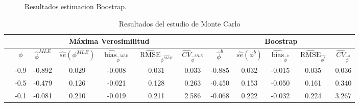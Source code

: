 \begin{figure}[h]
\begin{minipage}{0.45\textwidth}
    \caption{Resultados estimacion Boostrap.}
    \label{fig:monte_carlo_res2}
    \end{minipage}
\end{figure}

\begin{table}[h]
    \centering
    \caption{Resultados del estudio de Monte Carlo}
    \resizebox{18cm}{!} {
    \begin{tabular}{|c|cccccc|ccccc|}
    \hline
    \rowcolor[HTML]{FFFFFF} 
    \multicolumn{1}{|l|}{\cellcolor[HTML]{FFFFFF}} & \multicolumn{6}{c|}{\cellcolor[HTML]{FFFFFF}\textbf{Máxima Verosimilitud}} & \multicolumn{5}{c|}{\cellcolor[HTML]{FFFFFF}\textbf{Boostrap}} \\ \hline
    \rowcolor[HTML]{FFFFFF} 
    \multicolumn{1}{|l|}{\cellcolor[HTML]{FFFFFF}n} & \multicolumn{1}{c|}{\cellcolor[HTML]{FFFFFF}\textbf{$\phi$}} & \multicolumn{1}{c|}{\cellcolor[HTML]{FFFFFF}\textbf{$\hat{\phi}^{MLE}$}} & \multicolumn{1}{c|}{\cellcolor[HTML]{FFFFFF}\textbf{$\hat{se}(\phi^{MLE})$}} & \multicolumn{1}{c|}{\cellcolor[HTML]{FFFFFF}\textbf{$\widehat{\operatorname{bias}}_{\hat{\phi}^{MLE}}$}} & \multicolumn{1}{c|}{\cellcolor[HTML]{FFFFFF}\textbf{$\widehat{\operatorname{RMSE}}_{\hat{\phi^{MLE}}}$}} & \textbf{$\widehat{CV}_{\hat{\phi}^{MLE}}$} & \multicolumn{1}{c|}{\cellcolor[HTML]{FFFFFF}\textbf{$\hat{\phi}^{b}$}} & \multicolumn{1}{c|}{\cellcolor[HTML]{FFFFFF}\textbf{$\hat{se}(\phi^{b})$}} & \multicolumn{1}{c|}{\cellcolor[HTML]{FFFFFF}\textbf{$\widehat{\operatorname{bias}}_{\hat{\phi}^{b}}$}} & \multicolumn{1}{c|}{\cellcolor[HTML]{FFFFFF}\textbf{$\widehat{\operatorname{RMSE}}_{\hat{\phi^{b}}}$}} & \textbf{$\widehat{CV}_{\hat{\phi}^{b}}$} \\ \hline
     & \multicolumn{1}{c|}{-0.9} & \multicolumn{1}{c|}{-0.892} & \multicolumn{1}{c|}{0.029} & \multicolumn{1}{c|}{-0.008} & \multicolumn{1}{c|}{0.031} & 0.033 & \multicolumn{1}{c|}{-0.885} & \multicolumn{1}{c|}{0.032} & \multicolumn{1}{c|}{-0.015} & \multicolumn{1}{c|}{0.035} & 0.036 \\ \cline{2-12} 
     & \multicolumn{1}{c|}{-0.5} & \multicolumn{1}{c|}{-0.479} & \multicolumn{1}{c|}{0.126} & \multicolumn{1}{c|}{-0.021} & \multicolumn{1}{c|}{0.128} & 0.263 & \multicolumn{1}{c|}{-0.450} & \multicolumn{1}{c|}{0.153} & \multicolumn{1}{c|}{-0.050} & \multicolumn{1}{c|}{0.161} & 0.340 \\ \cline{2-12} 
     & \multicolumn{1}{c|}{-0.1} & \multicolumn{1}{c|}{-0.081} & \multicolumn{1}{c|}{0.210} & \multicolumn{1}{c|}{-0.019} & \multicolumn{1}{c|}{0.211} & 2.586 & \multicolumn{1}{c|}{-0.068} & \multicolumn{1}{c|}{0.222} & \multicolumn{1}{c|}{-0.032} & \multicolumn{1}{c|}{0.224} & 3.267 \\ \cline{2-12} 

\end{tabular}}
\end{table}
